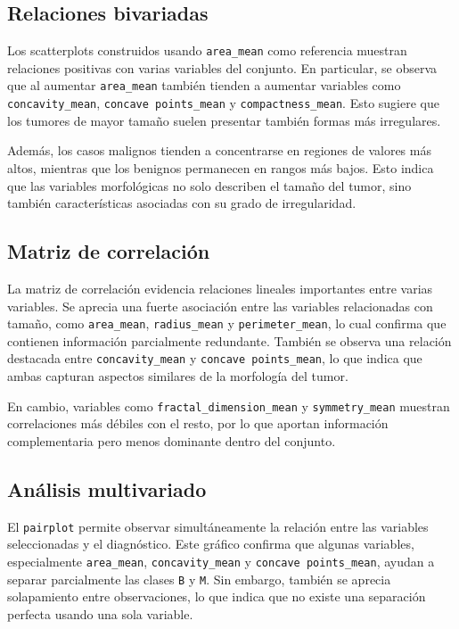 \documentclass[12pt]{article}
\begin{document}
\subsection{Relaciones bivariadas}

Los scatterplots construidos usando \texttt{area\_mean} como referencia muestran relaciones positivas con varias variables del conjunto.  
En particular, se observa que al aumentar \texttt{area\_mean} también tienden a aumentar variables como \texttt{concavity\_mean}, \texttt{concave points\_mean} y \texttt{compactness\_mean}.  
Esto sugiere que los tumores de mayor tamaño suelen presentar también formas más irregulares.

Además, los casos malignos tienden a concentrarse en regiones de valores más altos, mientras que los benignos permanecen en rangos más bajos.  
Esto indica que las variables morfológicas no solo describen el tamaño del tumor, sino también características asociadas con su grado de irregularidad.

\subsection{Matriz de correlación}

La matriz de correlación evidencia relaciones lineales importantes entre varias variables.  
Se aprecia una fuerte asociación entre las variables relacionadas con tamaño, como \texttt{area\_mean}, \texttt{radius\_mean} y \texttt{perimeter\_mean}, lo cual confirma que contienen información parcialmente redundante.  
También se observa una relación destacada entre \texttt{concavity\_mean} y \texttt{concave points\_mean}, lo que indica que ambas capturan aspectos similares de la morfología del tumor.

En cambio, variables como \texttt{fractal\_dimension\_mean} y \texttt{symmetry\_mean} muestran correlaciones más débiles con el resto, por lo que aportan información complementaria pero menos dominante dentro del conjunto.

\subsection{Análisis multivariado}

El \texttt{pairplot} permite observar simultáneamente la relación entre las variables seleccionadas y el diagnóstico.  
Este gráfico confirma que algunas variables, especialmente \texttt{area\_mean}, \texttt{concavity\_mean} y \texttt{concave points\_mean}, ayudan a separar parcialmente las clases \texttt{B} y \texttt{M}.  
Sin embargo, también se aprecia solapamiento entre observaciones, lo que indica que no existe una separación perfecta usando una sola variable.
\end{document}

